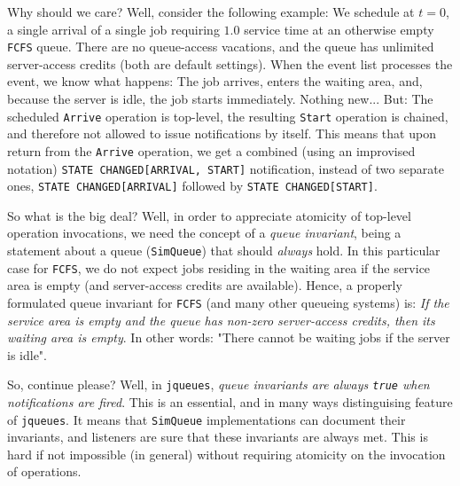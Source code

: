 \documentclass[12pt]{book}
\begin{document}
Why should we care? Well, consider the following example:
  We schedule at $t=0$, a single arrival of a single job
  requiring $1.0$ service time
  at an
  otherwise empty \lstinline|FCFS| queue.
There are no queue-access vacations,
  and the queue has unlimited
  server-access credits
  (both are default settings).
When the event list processes the event,
  we know what happens:
  The job arrives,
  enters the waiting area,
  and, because the server is idle,
  the job starts immediately.
Nothing new...
But: The scheduled \lstinline|Arrive| operation
  is top-level, the resulting \lstinline|Start| operation
  is chained, and therefore not allowed to issue notifications
  by itself.
This means that upon return from the \lstinline|Arrive| operation,
  we get a combined (using an improvised notation)
  \lstinline|STATE CHANGED[ARRIVAL, START]| notification,
  instead of two separate ones,
  \lstinline|STATE CHANGED[ARRIVAL]|
  followed by \lstinline|STATE CHANGED[START]|.

So what is the big deal?
Well, in order to appreciate atomicity of top-level operation invocations,
  we need the concept of a {\em queue invariant},
  being a statement about a queue (\lstinline|SimQueue|)
  that should {\em always\/} hold.
In this particular case for \lstinline|FCFS|,
  we do not expect jobs residing in the waiting area
  if the service area is empty
  (and server-access credits are available).
Hence, a properly formulated queue invariant
  for \lstinline|FCFS| (and many other queueing systems) is:
  {\em If the service area is empty and the queue has non-zero
       server-access credits, then its waiting area is empty}.
In other words: "There cannot be waiting jobs if the server is idle".

So, continue please?
Well, in \lstinline|jqueues|,
  {\em queue invariants are always \lstinline|true| when notifications are fired}.
This is an essential, and in many ways distinguising feature of \lstinline|jqueues|.
It means that \lstinline|SimQueue| implementations can document
  their invariants,
  and listeners are sure that these invariants are always met.
This is hard if not impossible (in general) without requiring atomicity on
  the invocation of operations.
\end{document}
